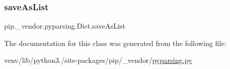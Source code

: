 \subsubsection{\texorpdfstring{save\+As\+List}{saveAsList}}
{\footnotesize\ttfamily pip.\+\_\+vendor.\+pyparsing.\+Dict.\+save\+As\+List}



The documentation for this class was generated from the following file\+:\begin{DoxyCompactItemize}
\item 
venv/lib/python3./site-\/packages/pip/\+\_\+vendor/\hyperlink{pip_2__vendor_2pyparsing_8py}{pyparsing.\+py}\end{DoxyCompactItemize}
